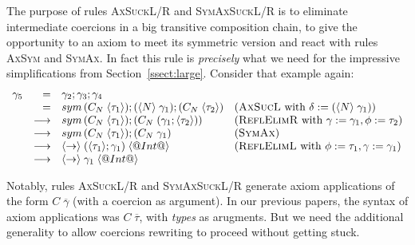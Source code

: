 \documentclass[a4paper,UKenglish]{lipics}
\makeatletter
\def\rulename#1{\textsc{#1}}
\newcommand{\psim}{\mathrel{\sim_{\tiny \#}}}
\def\rulename#1{\textsc{#1}}
\newcommand{\ol}[1]{\overline{#1}}
\newcommand{\sym}[1]{\mathop{sym}\, #1}
\newcommand{\nth}[2]{\mathop{nth} #1\;#2}
\newcommand{\inst}[2]{#1@#2}
\newcommand{\refl}[1]{\langle#1\rangle}  %
\newcommand{\gammas}{\ol{\gamma}}
\newcommand{\taus}{\ol{\tau}}
\makeatother
\begin{document}
The purpose of rules \rulename{AxSuckL/R} and \rulename{SymAxSuckL/R} is to eliminate intermediate coercions in a
big transitive composition chain, to give the opportunity to an axiom to meet its symmetric version and react 
with rules \rulename{AxSym} and \rulename{SymAx}. In fact this rule is {\em precisely} what we need for the 
impressive simplifications from Section~\ref{ssect:large}. Consider that example again:
\[\begin{array}{lrll}
 \gamma_5 & = &  \gamma_2;\gamma_3;\gamma_4 \\
          & = &  \sym{(C_N\;\refl{\tau_1})};(\refl{N}\;\gamma_1);(C_N\;\refl{\tau_2})    & (\rulename{AxSucL} \text{ with } \delta := (\refl{N}\;\gamma_1)) \\
          & \longrightarrow & \sym{(C_N\;\refl{\tau_1})};(C_N\;(\gamma_1;\refl{\tau_2})) & (\rulename{ReflElimR} \text{ with } \gamma := \gamma_1, \phi := \tau_2) \\
          & \longrightarrow & \sym{(C_N\;\refl{\tau_1})};(C_N\;\gamma_1)                 & (\rulename{SymAx}) \\
          & \longrightarrow & \refl{\to}\;(\refl{\tau_1};\gamma_1)\;\refl{@Int@}        & (\rulename{ReflElimL} \text{ with } \phi := \tau_1,\gamma := \gamma_1) \\
          & \longrightarrow & \refl{\to}\;\gamma_1\;\refl{@Int@} 
\end{array}\] 

Notably, rules \rulename{AxSuckL/R} and \rulename{SymAxSuckL/R} generate
axiom applications of the form $C\;\gammas$ (with a coercion as argument).
In our previous papers, the syntax of axiom applications was $C\;\taus$, with \emph{types}
as arugments.  But we need the additional generality to allow coercions rewriting to
proceed without getting stuck.


\end{document}
